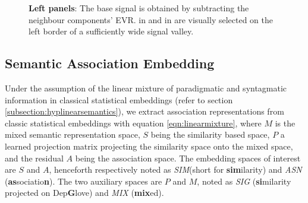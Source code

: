 \begin{figure}
    \centering
    \caption[Smoothed Differentiated EVR of WordNet Embedding PCs]{\textbf{Left panels}: The base signal is obtained by subtracting the neighbour components' EVR.  in  and  in  are visually selected on the left border of a sufficiently wide signal valley. }
    \label{fig:SimDimensionSelectionVarRatioDiff}
\end{figure}


\subsection{Semantic Association Embedding}

Under the assumption of the linear mixture of paradigmatic and syntagmatic information in classical statistical embeddings (refer to section \ref{subsection:hyplinearsemantics}), we extract association representations from classic statistical embeddings with equation \ref{eqn:linearmixture}, where \(M\) is the mixed semantic representation space, \(S\) being the similarity based space, \(P\) a learned projection matrix projecting the similarity space onto the mixed space, and the residual \(A\) being the association space. The embedding spaces of interest are \(S\) and \(A\), henceforth respectively noted as \emph{SIM}(short for \textbf{sim}ilarity) and \emph{ASN} (\textbf{as}sociatio\textbf{n}). The two auxiliary spaces are \(P\) and \(M\), noted as \emph{SIG} (\textbf{si}milarity projected on Dep\textbf{G}love) and \emph{MIX} (\textbf{mix}ed).

